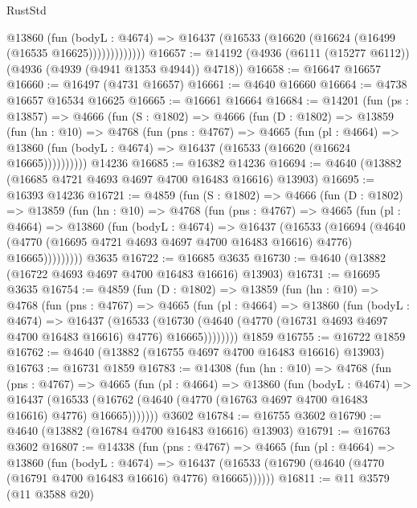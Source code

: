 \begin{lexlean}{RustStd}
\begin{coremodule}
                @13860
                  (fun (bodyL : @4674) =>
                  @16437 (@16533 (@16620 (@16624 (@16499 (@16535 @16625)))))))))))))
@16657 := @14192 (@4936 (@6111 (@15277 @6112)) (@4936 (@4939 (@4941 @1353 @4944)) @4718))
@16658 := @16647 @16657
@16660 := @16497 (@4731 @16657)
@16661 := @4640 @16660
@16664 := @4738 @16657 @16534 @16625
@16665 := @16661 @16664
@16684 := @14201
    (fun (ps : @13857) =>
    @4666
      (fun (S : @1802) =>
      @4666
        (fun (D : @1802) =>
        @13859
          (fun (hn : @10) =>
          @4768
            (fun (pns : @4767) =>
            @4665
              (fun (pl : @4664) =>
              @13860 (fun (bodyL : @4674) => @16437 (@16533 (@16620 (@16624 @16665))))))))))
    @14236
@16685 := @16382 @14236
@16694 := @4640 (@13882 (@16685 @4721 @4693 @4697 @4700 @16483 @16616) @13903)
@16695 := @16393 @14236
@16721 := @4859
    (fun (S : @1802) =>
    @4666
      (fun (D : @1802) =>
      @13859
        (fun (hn : @10) =>
        @4768
          (fun (pns : @4767) =>
          @4665
            (fun (pl : @4664) =>
            @13860
              (fun (bodyL : @4674) =>
              @16437
                (@16533
                  (@16694
                    (@4640
                      (@4770 (@16695 @4721 @4693 @4697 @4700 @16483 @16616) @4776)
                      @16665)))))))))
    @3635
@16722 := @16685 @3635
@16730 := @4640 (@13882 (@16722 @4693 @4697 @4700 @16483 @16616) @13903)
@16731 := @16695 @3635
@16754 := @4859
    (fun (D : @1802) =>
    @13859
      (fun (hn : @10) =>
      @4768
        (fun (pns : @4767) =>
        @4665
          (fun (pl : @4664) =>
          @13860
            (fun (bodyL : @4674) =>
            @16437
              (@16533
                (@16730 (@4640 (@4770 (@16731 @4693 @4697 @4700 @16483 @16616) @4776) @16665))))))))
    @1859
@16755 := @16722 @1859
@16762 := @4640 (@13882 (@16755 @4697 @4700 @16483 @16616) @13903)
@16763 := @16731 @1859
@16783 := @14308
    (fun (hn : @10) =>
    @4768
      (fun (pns : @4767) =>
      @4665
        (fun (pl : @4664) =>
        @13860
          (fun (bodyL : @4674) =>
          @16437
            (@16533 (@16762 (@4640 (@4770 (@16763 @4697 @4700 @16483 @16616) @4776) @16665)))))))
    @3602
@16784 := @16755 @3602
@16790 := @4640 (@13882 (@16784 @4700 @16483 @16616) @13903)
@16791 := @16763 @3602
@16807 := @14338
    (fun (pns : @4767) =>
    @4665
      (fun (pl : @4664) =>
      @13860
        (fun (bodyL : @4674) =>
        @16437 (@16533 (@16790 (@4640 (@4770 (@16791 @4700 @16483 @16616) @4776) @16665))))))
@16811 := @11 @3579 (@11 @3588 @20)

\end{coremodule}
\end{lexlean}

